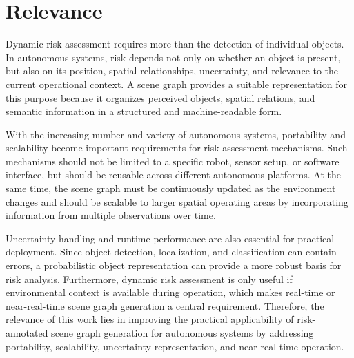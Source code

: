 \section{Relevance}
\small{
Dynamic risk assessment requires more than the detection of individual objects. In autonomous systems, risk depends not only on whether an object is present, but also on its position, spatial relationships, uncertainty, and relevance to the current operational context. A scene graph provides a suitable representation for this purpose because it organizes perceived objects, spatial relations, and semantic information in a structured and machine-readable form.

With the increasing number and variety of autonomous systems, portability and scalability become important requirements for risk assessment mechanisms. Such mechanisms should not be limited to a specific robot, sensor setup, or software interface, but should be reusable across different autonomous platforms. At the same time, the scene graph must be continuously updated as the environment changes and should be scalable to larger spatial operating areas by incorporating information from multiple observations over time.

Uncertainty handling and runtime performance are also essential for practical deployment. Since object detection, localization, and classification can contain errors, a probabilistic object representation can provide a more robust basis for risk analysis. Furthermore, dynamic risk assessment is only useful if environmental context is available during operation, which makes real-time or near-real-time scene graph generation a central requirement. Therefore, the relevance of this work lies in improving the practical applicability of risk-annotated scene graph generation for autonomous systems by addressing portability, scalability, uncertainty representation, and near-real-time operation.

}

